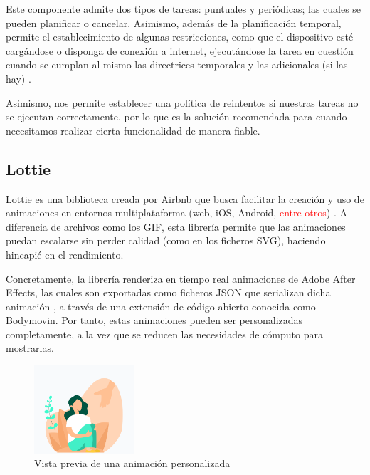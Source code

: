             Este componente admite dos tipos de tareas: puntuales y periódicas; las cuales se pueden planificar o 
            cancelar. Asimismo, además de la planificación temporal, permite el establecimiento de algunas restricciones,
            como que el dispositivo esté cargándose o disponga de conexión a internet, ejecutándose la tarea en cuestión
            cuando se cumplan al mismo las directrices temporales y las adicionales (si las hay) 
            \cite{noauthor_arquitectura_nodate}.

            Asimismo, nos permite establecer una política de reintentos si nuestras tareas no se ejecutan correctamente,
            por lo que es la solución recomendada para cuando necesitamos realizar cierta funcionalidad de manera fiable.
            

        \subsection{Lottie}
            Lottie es una biblioteca creada por Airbnb que busca facilitar la creación y uso de animaciones en entornos
            multiplataforma (web, iOS, Android, \textcolor{red}{entre otros}) \cite{rubianes_lottie_2021}. A diferencia de archivos como los GIF, 
            esta librería permite que
            las animaciones puedan escalarse sin perder calidad (como en los ficheros SVG), haciendo hincapié en el
            rendimiento.

            Concretamente, la librería renderiza en tiempo real animaciones de Adobe After Effects, las cuales
            son exportadas como ficheros JSON que serializan dicha animación \cite{noauthor_lottie_nodate}, a través de
            una extensión de código abierto conocida como Bodymovin. Por tanto, 
            estas animaciones pueden
            ser personalizadas completamente, a la vez que se reducen las necesidades de cómputo para mostrarlas. 
            
            \begin{figure}[h]
                \centering
                \includegraphics[width=0.33\textwidth]{figures/Animacion de ejemplo.PNG}
                \caption{Vista previa de una animación personalizada}
                \label{figure:lottie:animacion_ejemplo}
            \end{figure}

